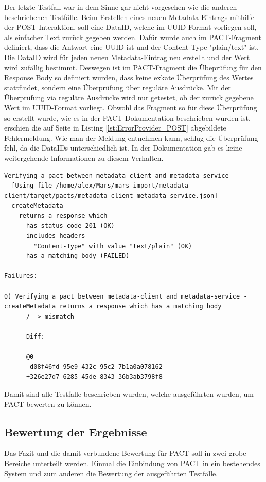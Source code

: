 \documentclass{llncs}
\begin{document}
Der letzte Testfall war in dem Sinne gar nicht vorgesehen wie die anderen beschriebenen Testfälle. Beim Erstellen eines neuen Metadata-Eintrags mithilfe der POST-Interaktion, soll eine DataID, welche im UUID-Format vorliegen soll, als einfacher Text zurück gegeben werden. Dafür wurde auch im PACT-Fragment definiert, dass die Antwort eine UUID ist und der Content-Type "plain/text" ist. Die DataID wird für jeden neuen Metadata-Eintrag neu erstellt und der Wert wird zufällig bestimmt. Deswegen ist im PACT-Fragment die Übeprüfung für den Response Body so definiert wurden, dass keine exkate Überprüfung des Wertes stattfindet, sondern eine Überprüfung über reguläre Ausdrücke.  Mit der Überprüfung via reguläre Ausdrücke wird nur getestet, ob der zurück gegebene Wert im UUID-Format vorliegt. Obwohl das Fragment so für diese Überprüfung so erstellt wurde, wie es in der PACT Dokumentation beschrieben wurden ist, erschien die auf Seite \pageref{lst:ErrorProvider_POST} in Listing \ref{lst:ErrorProvider_POST} abgebildete Fehlermeldung. Wie man der Meldung entnehmen kann, schlug die Überprüfung fehl, da die DataIDs unterschiedlich ist. In der Dokumentation gab es keine weitergehende Informationen zu diesem Verhalten.

\begin{lstlisting}[caption=Test,label={lst:ErrorProvider_POST}]
Verifying a pact between metadata-client and metadata-service
  [Using file /home/alex/Mars/mars-import/metadata-client/target/pacts/metadata-client-metadata-service.json]
  createMetadata
    returns a response which
      has status code 201 (OK)
      includes headers
        "Content-Type" with value "text/plain" (OK)
      has a matching body (FAILED)

Failures:

0) Verifying a pact between metadata-client and metadata-service - createMetadata returns a response which has a matching body
      / -> mismatch

      Diff:

      @0
      -d08f46fd-95e9-432c-95c2-7b1a0a078162
      +326e27d7-6285-45de-8343-36b3ab3798f8
\end{lstlisting}

Damit sind alle Testfalle beschrieben wurden, welche ausgeführten wurden, um PACT bewerten zu können.

\subsection{Bewertung der Ergebnisse}
Das Fazit und die damit verbundene Bewertung für PACT soll in zwei grobe Bereiche unterteilt werden. Einmal die Einbindung von PACT in ein bestehendes System und zum anderen die Bewertung der ausgeführten Testfälle.
\end{document}
